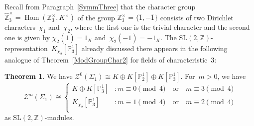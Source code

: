 \documentclass[12pt]{article}
\theoremstyle{definition}
\newtheorem{Theorem}[Satz]{Theorem}
\theoremstyle{break}
\newcommand{\Z}{\mathbb{Z}}
\DeclareMathOperator\Hom{Hom}
\newcommand{\SL}{\mathrm{SL}}
\renewcommand{\P}{\mathbb{P}}
\renewcommand{\1}{\mathbbm{1}}
\newcommand{\TFT}{\mathcal{Z}}
\renewcommand{\P}{\mathbb{P}}
\begin{document}
Recall from Paragraph~\ref{SymmThree} that the
character group $\hat{\Z}_3^\times = \Hom(\Z_3^\times, K^\times)$ of the group
$\Z_3^\times = \{\bar{1}, -\bar{1}\}$ consists of two Dirichlet characters~$\chi_1$ and~$\chi_2$, where the first one is the trivial character and the second one is given by
$\chi_2(\bar{1}) = 1_K$ and~$\chi_2(-\bar{1}) = -1_K$.
The $\SL(2, \Z)$-representation~$K_{\chi_2}[\P^1_3]$ already discussed there appears in the following analogue of Theorem~\ref{ModGroupChar2} for fields of characteristic~$3$:
\begin{Theorem} \label{ModGroupChar3}
We have $\TFT^0(\Sigma_{1}) \cong K \oplus K[\P^1_2] \oplus K[\P^1_3]$. For~$m > 0$, we have
\[\TFT^m(\Sigma_{1}) \cong
\begin{cases}
K \oplus K[\P^1_3] &: m \equiv 0 \pmod{4} \quad \text{or} \quad m \equiv 3 \pmod{4}\\
K_{\chi_2}[\P^1_3] &: m \equiv 1 \pmod{4}  \quad \text{or} \quad m \equiv 2 \pmod{4}\\
\end{cases}\]
as $\SL(2,\Z)$-modules.
\end{Theorem}
\end{document}
